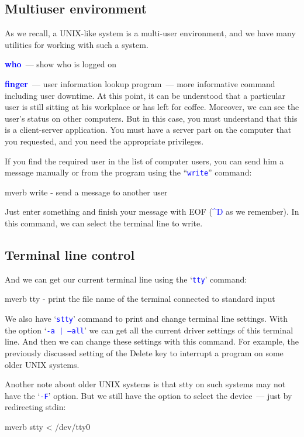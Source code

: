 \documentclass[12pt]{report}
\newcommand{\struct}[1]{\textcolor{blue}{#1}}
\newcommand{\cmd}[1]{\textcolor{blue}{\tt #1}}
\begin{document}
\subsection*{Multiuser environment}

As we recall, a UNIX-like system is a multi-user environment,
and we have many utilities for working with such a system.

{\bf\struct{who}}~--- show who is logged on

{\bf\struct{finger}}~--- user information lookup program~--- more informative
command including user downtime. At this point, it can be understood that
a particular user is still sitting at his workplace or has left for coffee.
Moreover, we can see the user's status on other computers. But in this case,
you must understand that this is a client-server application.
You must have a server part on the computer that you requested,
and you need the appropriate privileges.

If you find the required user in the list of computer users, you can send
him a message manually or from the program using the ``\cmd{write}'' command:
\begin{code}{mverb}
write - send a message to another user
\end{code}
Just enter something and finish your message with EOF (\struct{\^{}D} as we
remember). In this command, we can select the terminal line to write.

\subsection*{Terminal line control}

And we can get our current terminal line using the `\cmd{tty}' command:
\begin{code}{mverb}
tty - print the file name of the terminal connected
       to standard input
\end{code}

We also have `\cmd{stty}' command to print and change terminal line settings.
With the option `\cmd{-a | --all}' we can get all the current driver settings of
this terminal line. And then we can change these settings with this command.
For example, the previously discussed setting of the Delete key
to interrupt a program on some older UNIX systems.

Another note about older UNIX systems is that stty on such systems may not
have the `\cmd{-F}' option. But we still have the option to select
the device~--- just by redirecting stdin:
\begin{code}{mverb}
stty < /dev/tty0
\end{code}
\end{document}
